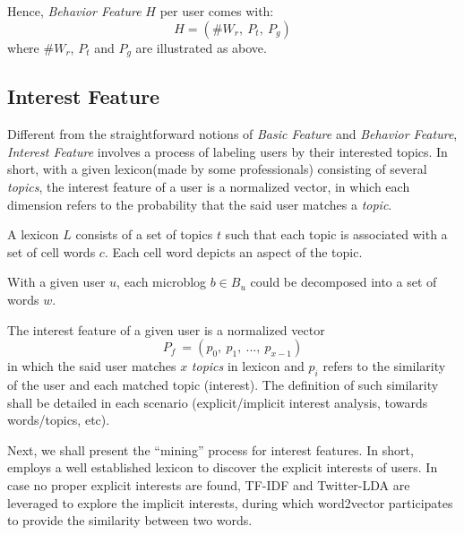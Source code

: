 Hence, \textit{Behavior Feature} $H$ per user comes with:
\begin{equation}
\label{eq:beha}
	H = (\#W_r,\ P_t,\ P_g)
\end{equation}
where $\#W_r$, $P_t$ and $P_g$ are illustrated as above.

\subsection{Interest Feature}

Different from the straightforward notions of \textit{Basic Feature} and \textit{Behavior Feature}, \textit{Interest Feature} involves a process of labeling users by their interested topics.
In short, with a given lexicon(made by some professionals) consisting of several \textit{topics}, the interest feature of a user is a normalized vector, in which each dimension refers to the probability that the said user matches a \textit{topic}.

\begin{definition}
\label{def:lexi}
A lexicon $L$ consists of a set of topics $t$ such that each topic is associated with a set of cell words $c$. Each cell word depicts an aspect of the topic.
\end{definition}

\begin{definition}
\label{def:bw}
With a given user $u$, each microblog $b \in B_u$ could be decomposed into a set of words $w$.
\end{definition}

\begin{definition}
\label{def:inte}
The interest feature of a given user is a normalized vector
\begin{equation}
\label{eq:inte}
P_f\ = (p_0,\ p_1,\ ...,\ p_{x-1})
\end{equation}
in which the said user matches $x$ \textit{topics} in lexicon and $p_i$ refers to the similarity of the user and each matched topic (interest). The definition of such similarity shall be detailed in each scenario (explicit/implicit interest analysis, towards words/topics, etc).
\end{definition}


Next, we shall present the ``mining'' process for interest features. 
In short, \sys{} employs a well established lexicon to discover the explicit interests of users.
In case no proper explicit interests are found, TF-IDF and Twitter-LDA are leveraged to explore the implicit interests, during which word2vector participates to provide the similarity between two words.

